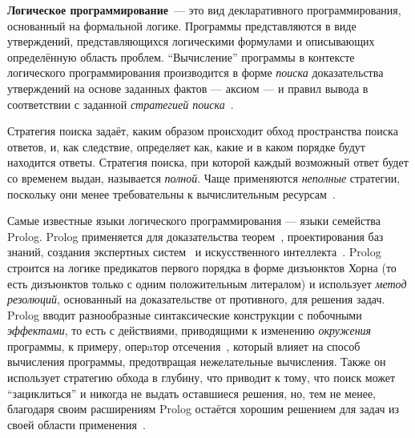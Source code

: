 {\bf Логическое программирование}~--- это вид декларативного программирования,
основанный на формальной логике. Программы представляются в виде
утверждений, представляющихся логическими формулами и описывающих
определённую область проблем.
``Вычисление'' программы в контексте логического программирования производится
в форме \emph{поиска} доказательства утверждений на основе заданных
фактов --- аксиом --- и правил вывода в соответствии с заданной
\emph{стратегией поиска}~\cite{logicMJ}.

Стратегия поиска задаёт,
каким образом происходит обход пространства поиска ответов, и,
как следствие, определяет как, какие и в каком порядке будут находится
ответы. Стратегия поиска, при которой каждый возможный ответ будет со временем
выдан, называется \emph{полной}. Чаще применяются \emph{неполные} стратегии,
поскольку они менее требовательны к вычислительным ресурсам~\cite{currySearch}.

Самые известные языки логического программирования --- языки семейства Prolog.
Prolog применяется для доказательства теорем~\cite{prologTheorem},
проектирования баз знаний, создания экспертных систем~\cite{prologExSys}
и искусственного интеллекта~\cite{prologInt}.
Prolog строится на логике предикатов первого порядка в форме дизъюнктов
Хорна (то есть дизъюнктов только с одним положительным литералом) и
использует \emph{метод резолюций}, основанный на доказательстве от
противного, для решения задач.
Prolog вводит разнообразные синтаксические конструкции с
побочными \emph{эффектами}, то есть с действиями, приводящими к изменению
\emph{окружения} программы, к примеру, оперaтор отсечения~,
который влияет на способ вычисления программы, предотвращая нежелательные
вычисления.
Также он использует стратегию обхода в глубину, что приводит к тому, что
поиск может ``зациклиться'' и никогда не выдать оставшиеся решения,
но, тем не менее, благодаря своим расширениям Prolog
остаётся хорошим решением для задач из своей области применения~\cite{logicMJ}.




